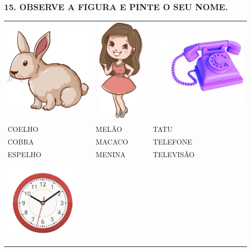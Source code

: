 \subsubsection{15. OBSERVE A FIGURA E PINTE O SEU
NOME.}\label{observe-a-figura-e-pinte-o-seu-nome.}

\begin{longtable}[]{@{}lll@{}}
\toprule
\includegraphics[width=1.66771in,height=1.63535in]{media/image70.png} &
\includegraphics[width=1.03234in,height=1.99479in]{media/image72.png} &
\includegraphics[width=1.86146in,height=1.63165in]{media/image73.png}\tabularnewline
COELHO & MELÃO & TATU\tabularnewline
COBRA & MACACO & TELEFONE\tabularnewline
ESPELHO & MENINA & TELEVISÃO\tabularnewline
\includegraphics[width=1.44836in,height=1.64634in]{media/image74.png} &

\end{longtable}
